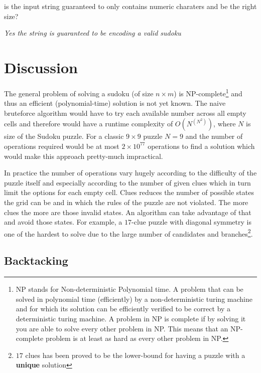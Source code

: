 \begin{QandA}
	\item is the input string guaranteed to only contains numeric charaters and be the right size?
	\begin{answered}
		\textit{Yes the string is guaranteed to be encoding a valid sudoku}
	\end{answered}	
\end{QandA}

\section{Discussion}
\label{sudoku:sec:discussion}
The general problem of solving a sudoku (of size $n\times m$) is NP-complete\footnote{NP stands for
Non-deterministic Polynomial time. A problem that can be solved in polynomial time (efficiently) by
a non-deterministic turing machine and for which its solution can be efficiently verified to be
correct by a deterministic turing machine. A problem in NP is complete if by solving it you are able
to solve every other problem in NP. This means that an NP-complete problem is at least as hard as
every other problem in NP.} and thus an efficient (polynomial-time) solution is not yet known. The
naive bruteforce algorithm would have to try each available number across all empty cells and
therefore would have a runtime complexity of $O(N^{(N^2)})$, where $N$ is size of the Sudoku puzzle.
For a classic  $9 \times 9$ puzzle $N = 9$ and the number of operations required would be at most $2
\times 10^{77}$ operations to find a solution which would make this approach pretty-much
impractical. 

In practice the number of operations vary hugely according to the difficulty of the puzzle itself
and especially according to the number of given clues which in turn limit the options for each empty
cell. Clues reduces the number of possible states the grid can be and in which the rules of the
puzzle are not violated. The more clues the more are those invalid states. An algorithm can take
advantage of that and avoid those states. For example, a $17$-clue puzzle with diagonal symmetry is
one of the hardest to solve due to the large number of candidates and branches\footnote{$17$ clues
has been proved to be the lower-bound for having a puzzle with a \textbf{unique} solution}. 

\subsection{Backtacking}
\label{sudoku:sec:bruteforce}

